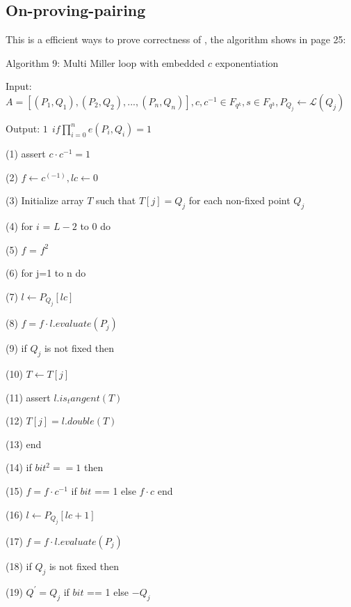\subsection{On-proving-pairing}

This is a efficient ways to prove correctness of \cite{website:On-proving-pairing}, the algorithm shows in page 25:

Algorithm 9: Multi Miller loop with embedded $c$ exponentiation 

Input: $\displaystyle A = [(P_1,Q_1), (P_2,Q_2),...,(P_n,Q_n)],c, c^{-1} \in F_{q^k},s \in F_{q^3},P_{Q_j} \leftarrow \mathcal{L}(Q_j)$ 

Output: $\displaystyle 1 \ \ if \prod_{i=0}^{n}e(P_i, Q_i) = 1 $ 

(1) assert $\displaystyle c \cdot c^{-1} = 1 $ 

(2) $\displaystyle f \leftarrow c^(-1), lc \leftarrow 0 $ 

(3) Initialize array $T$ such that $\displaystyle T[j] = Q_j $ for each non-fixed point $Q_j$ 

(4) for $i$ = $L-2$ to $0$ do 

(5) \indent $f$ = $f^2$ 

(6) \indent for j=1 to n do 

(7) \indent \indent $\displaystyle l \leftarrow P_{Q_j}[lc] $ 

(8) \indent \indent $\displaystyle f = f \cdot l.evaluate(P_j) $  

(9) \indent \indent if $Q_j$ is not fixed then 

(10) \indent \indent \indent $\displaystyle T \leftarrow T[j] $ 

(11) \indent \indent \indent assert $\displaystyle l.is_tangent(T) $ 

(12) \indent \indent \indent $\displaystyle T[j] = l.double(T) $ 

(13) \indent \indent end 

(14) \indent \indent if $bit^2 == 1$ then 

(15) \indent \indent \indent $\displaystyle f = f \cdot c^{-1}$ if $bit$ == 1 else $\displaystyle f \cdot c$ end 

(16) \indent \indent \indent $\displaystyle l \leftarrow P_{Q_j}[lc+1] $ 

(17) \indent \indent \indent $\displaystyle f = f \cdot l.evaluate(P_{j})$ 

(18) \indent \indent \indent if $Q_j$ is not fixed then 

(19) \indent \indent \indent \indent $\displaystyle Q^{'} = Q_j $ if $bit$ == 1 else $\displaystyle -Q_j $ 

